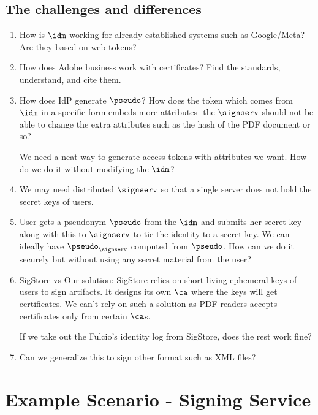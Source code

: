\subsection{The challenges and differences}
\begin{enumerate}
    \item How is $\idm$ working for already established systems such as Google/Meta? Are they based on web-tokens?
    \item How does Adobe business work with certificates? Find the standards, understand, and cite them.
     
    \item How does IdP generate $\pseudo$? How does the token which comes from $\idm$ in a specific form embeds more attributes -the $\signserv$ should not be able to change the extra attributes such as the hash of the PDF document or so?

    We need a neat way to generate access tokens with attributes we want. How do we do it without modifying the $\idm$?

    \item We may need distributed $\signserv$ so that a single server does not hold the secret keys of users.

    \item User gets a pseudonym $\pseudo$ from the $\idm$ and submits her secret key along with this to $\signserv$ to tie the identity to a secret key.
    We can ideally have $\pseudo_\signserv$ computed from $\pseudo$. How can we do it securely but without using any secret material from the user?

     \item SigStore vs Our solution: SigStore relies on short-living ephemeral keys of users to sign artifacts. It designs its own $\ca$ where the keys will get certificates. We can't rely on such a solution as PDF readers accepts certificates only from certain $\ca$s.

    If we take out the Fulcio's identity log from SigStore, does the rest work fine?

    \item Can we generalize this to sign other format such as XML files? 
\end{enumerate}


\section{Example Scenario - Signing Service}

